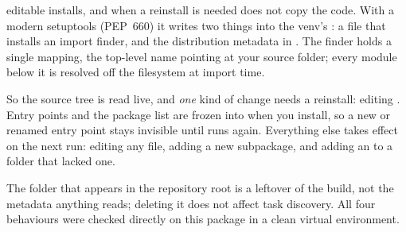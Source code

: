 \begin{isaacbox}{editable installs, and when a reinstall is needed}
 does not copy the code. With a modern
setuptools (PEP~660) it writes two things into the venv's
: a  file that installs an import finder, and
the distribution metadata in . The
finder holds a single mapping, the top-level name 
pointing at your source folder; every module below it is resolved off the
filesystem at import time.

So the source tree is read live, and \emph{one} kind of change needs a
reinstall: editing . Entry points and the package list
are frozen into  when you install, so a new or renamed entry
point stays invisible until  runs again. Everything else
takes effect on the next run: editing any  file, adding a new
subpackage, and adding an  to a folder that lacked one.

The  folder that appears in the repository
root is a leftover of the build, not the metadata anything reads; deleting it
does not affect task discovery. All four behaviours were checked directly on
this package in a clean virtual environment.
\end{isaacbox}
